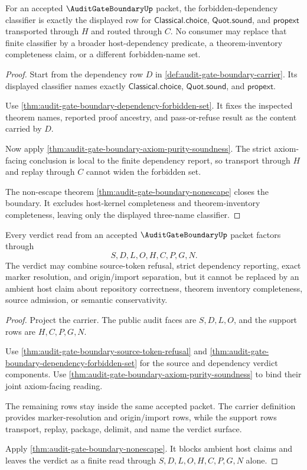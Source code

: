 \begin{theorem}
\label{thm:audit-gate-boundary-forbidden-dependency-scope}
For an accepted $\AuditGateBoundaryUp$ packet, the forbidden-dependency classifier is exactly the displayed row for $\mathsf{Classical.choice}$, $\mathsf{Quot.sound}$, and $\mathsf{propext}$ transported through $H$ and routed through $C$. No consumer may replace that finite classifier by a broader host-dependency predicate, a theorem-inventory completeness claim, or a different forbidden-name set.
\end{theorem}
\begin{proof}
Start from the dependency row $D$ in \autoref{def:audit-gate-boundary-carrier}. Its displayed classifier names exactly $\mathsf{Classical.choice}$, $\mathsf{Quot.sound}$, and $\mathsf{propext}$.

Use \autoref{thm:audit-gate-boundary-dependency-forbidden-set}. It fixes the inspected theorem names, reported proof ancestry, and pass-or-refuse result as the content carried by $D$.

Now apply \autoref{thm:audit-gate-boundary-axiom-purity-soundness}. The strict axiom-facing conclusion is local to the finite dependency report, so transport through $H$ and replay through $C$ cannot widen the forbidden set.

The non-escape theorem \autoref{thm:audit-gate-boundary-nonescape} closes the boundary. It excludes host-kernel completeness and theorem-inventory completeness, leaving only the displayed three-name classifier.
\end{proof}

\begin{theorem}
\label{thm:audit-gate-boundary-verdict-scope}
Every verdict read from an accepted $\AuditGateBoundaryUp$ packet factors through
$$
S,D,L,O,H,C,P,G,N.
$$
The verdict may combine source-token refusal, strict dependency reporting, exact marker resolution, and origin/import separation, but it cannot be replaced by an ambient host claim about repository correctness, theorem inventory completeness, source admission, or semantic conservativity.
\end{theorem}
\begin{proof}
Project the carrier. The public audit faces are $S,D,L,O$, and the support rows are $H,C,P,G,N$.

Use \autoref{thm:audit-gate-boundary-source-token-refusal} and \autoref{thm:audit-gate-boundary-dependency-forbidden-set} for the source and dependency verdict components. Use \autoref{thm:audit-gate-boundary-axiom-purity-soundness} to bind their joint axiom-facing reading.

The remaining rows stay inside the same accepted packet. The carrier definition provides marker-resolution and origin/import rows, while the support rows transport, replay, package, delimit, and name the verdict surface.

Apply \autoref{thm:audit-gate-boundary-nonescape}. It blocks ambient host claims and leaves the verdict as a finite read through $S,D,L,O,H,C,P,G,N$ alone.
\end{proof}

